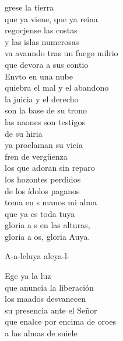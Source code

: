 \begin{cancion}%
	grese la tierra  \\
	\jump
que ya viene, que ya reina\\
	regocjense las costas \\
	\jump
y las islas numerosas\\
	va avanndo tras un fuego milrio\\
	que devora a sus contio\\
	\jump
	Envto en una nube \\
	\jump
quiebra el mal y el abandono\\
	la juicia y el derecho \\
	\jump
son la base de su trono\\
	las naones son testigos \\
	de su hiria\\
	ya proclaman su vicia\\
	\jump
	fren de vergüenza \\
	\jump
los que adoran sin reparo\\
	los hozontes perdidos \\
	\jump
de los ídolos paganos\\
	toma en s manos mi alma \\
	que ya es toda tuya\\
	gloria a s en las alturas, \\
	gloria a os, gloria Auya.\jump\\
	\begin{chorus}%
		A-a-leluya aleya-l-\jump\\
	\end{chorus}%
	Ege ya la luz \\
	\jump
que anuncia la liberación\\
	los maados desvanecen \\
	\jump
su presencia ante el Señor\\
	que enalce por encima de oroes\\
	a las almas de suiele\\

\end{cancion}
